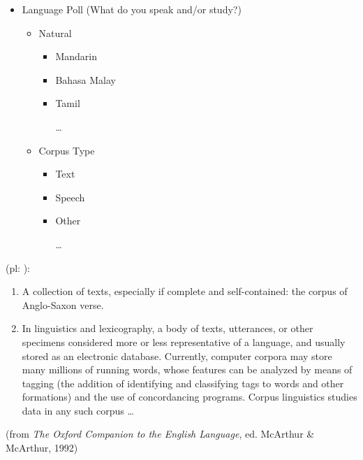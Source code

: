 \documentclass[a4paper,landscape,headrule,footrule]{foils}
\begin{document}

\begin{itemize}
\item Language Poll (What do you speak and/or study?)
  \begin{itemize}
  \item Natural
    \begin{itemize}
    \item Mandarin
    \item Bahasa Malay
    \item Tamil
    \item[\ldots]
    \end{itemize}
  \item Corpus Type
    \begin{itemize}
    \item Text
    \item Speech
    \item Other
    \item[\ldots]
    \end{itemize}
  \end{itemize}


\end{itemize}




 (pl: ):
\begin{enumerate}
\item A collection of texts, especially if
complete and self-contained: the corpus of
Anglo-Saxon verse.
\item In linguistics and lexicography, a body of texts, utterances, or other
specimens considered more or less representative
of a language, and usually stored as an electronic
database. Currently, computer corpora may store
many millions of running words, whose features can
be analyzed by means of tagging (the addition of
identifying and classifying tags to words and other
formations) and the use of concordancing
programs. Corpus linguistics studies data in any
such corpus \ldots
\end{enumerate}
(from \textit{The Oxford Companion to the English Language}, ed.
McArthur \& McArthur, 1992)
\end{document}
